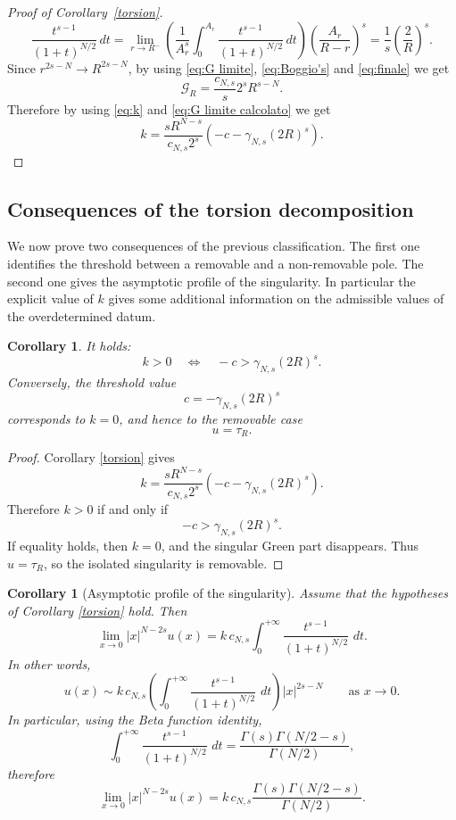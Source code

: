 \documentclass[11pt,a4paper]{article}
\newtheorem{corollary}[theorem]{Corollary}
\newcommand{\dd}{\,d}
\begin{document}
\begin{proof}[Proof of Corollary~\ref{torsion}]
\begin{equation}
\frac{t^{s-1}}{(1+t)^{N/2}}\dd t
=
\lim_{r\to R^-} \left(\frac{1}{A_{r}^s} \int_0^{A_r}
\frac{t^{s-1}}{(1+t)^{N/2}}\dd t\right) \left( \frac{A_r}{R-r} \right)^s
=
\frac1s\left(\frac2R\right)^s.
\end{equation}
Since \(r^{2s-N}\to R^{2s-N}\), by using \eqref{eq:G limite}, \eqref{eq:Boggio's} and \eqref{eq:finale} we get
\begin{equation}\label{eq:G limite calcolato}
\mathcal G_{R}
=
\frac{c_{N,s}}{s}
2^sR^{s-N}.
\end{equation}
Therefore by using \eqref{eq:k} and \eqref{eq:G limite calcolato} we get 
\[
k
=
\frac{sR^{N-s}}{c_{N,s}2^s}
\left(-c-\gamma_{N,s}(2R)^s\right).
\]
\end{proof}

\subsection{Consequences of the torsion decomposition}

We now prove two consequences of the previous classification. The first one identifies the threshold between a removable and a non-removable pole. The second one gives the asymptotic profile of the singularity.
In particular the explicit value of \(k\) gives some additional information on the admissible
values of the overdetermined datum.

\begin{corollary}
\label{cor:threshold-removability}
It holds:
\[
k>0
\quad\Longleftrightarrow\quad
-c>\gamma_{N,s}(2R)^s.
\]
Conversely, the threshold value
\[
c=-\gamma_{N,s}(2R)^s
\]
corresponds to \(k=0\), and hence to the removable case
\[
u=\tau_{R}.
\]
\end{corollary}

\begin{proof}
Corollary \ref{torsion} gives
\[
k=
\frac{sR^{N-s}}{c_{N,s}2^s}
\left(-c-\gamma_{N,s}(2R)^s\right).
\]
Therefore \(k>0\) if and only if
\[
-c>\gamma_{N,s}(2R)^s.
\]
If equality holds, then \(k=0\), and the singular Green part disappears.
Thus \(u=\tau_{R}\), so the isolated singularity is removable.
\end{proof}

\begin{corollary}[Asymptotic profile of the singularity]
\label{cor:singular-asymptotic}
Assume that the hypotheses of Corollary \ref{torsion} hold. Then
\[
\lim_{x\to0}|x|^{N-2s}u(x)
=
k\,c_{N,s}
\int_0^{+\infty}\frac{t^{s-1}}{(1+t)^{N/2}}\,\dd t.
\]
In other words,
\[
u(x)
\sim
k\,c_{N,s}
\left(\int_0^{+\infty}\frac{t^{s-1}}{(1+t)^{N/2}}\,\dd t\right)
|x|^{2s-N}
\qquad\text{as }x\to0.
\]
In particular, using the Beta function identity,
\[
\int_0^{+\infty}\frac{t^{s-1}}{(1+t)^{N/2}}\,\dd t
=
\frac{\Gamma(s)\Gamma(N/2-s)}{\Gamma(N/2)},
\]
therefore
\[
\lim_{x\to0}|x|^{N-2s}u(x)
=
k\,c_{N,s}
\frac{\Gamma(s)\Gamma(N/2-s)}{\Gamma(N/2)}.
\]
\end{corollary}
\end{document}
